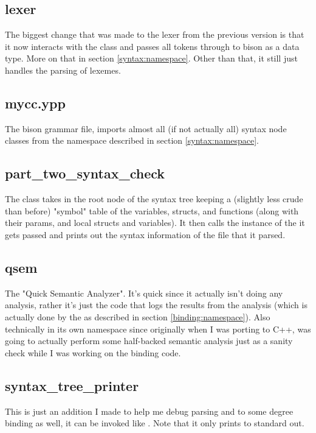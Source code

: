 \documentclass{article}
\begin{document}
\subsection{lexer}
\label{default:lexer}
The biggest change that was made to the lexer from the previous version is that it now interacts with the  class and passes all tokens through to bison as a  data type.
More on that in section \ref{syntax:namespace}.
Other than that, it still just handles the parsing of lexemes.

\subsection{mycc.ypp}
\label{default:parser}
The bison grammar file, imports almost all (if not actually all) syntax node classes from the  namespace described in section \ref{syntax:namespace}.

\subsection{part\_two\_syntax\_check}
\label{default:syntaxcheck}
The  class takes in the root node of the syntax tree keeping a (slightly less crude than before) "symbol" table of the variables, structs, and functions (along with their params, and local structs and variables).
It then calls the instance of the  it gets passed and prints out the syntax information of the file that it parsed.

\subsection{qsem}
\label{default:qsem}
The "Quick Semantic Analyzer".
It's quick since it actually isn't doing any analysis, rather it's just the code that logs the results from the analysis (which is actually done by the  as described in section \ref{binding:namespace}).
Also technically in its own namespace since originally when I was porting to C++,  was going to actually perform some half-backed semantic analysis just as a sanity check while I was working on the binding code. 

\subsection{syntax\_tree\_printer}
\label{default:syntaxtreeprinter}
This is just an addition I made to help me debug parsing and to some degree binding as well, it can be invoked like .
Note that it only prints to standard out.
\end{document}
